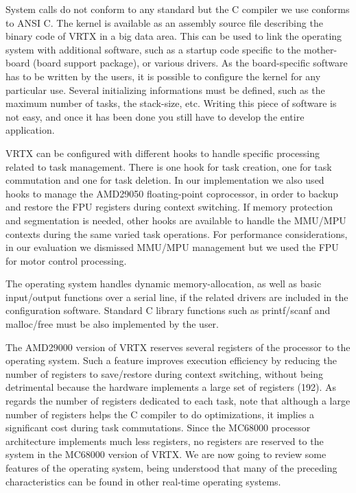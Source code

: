 \documentclass[10pt]{report}
\begin{document}
System calls do not conform to any standard but the C compiler we
use conforms to ANSI C. The kernel is available as an assembly
source file describing the binary code of VRTX in a big data area. 
This can be used to link the operating system with additional
software, such as a startup code specific to the mother-board 
(board support package), or various drivers. As the board-specific software
has to be written by the users, it is possible to configure the kernel
for any particular use. Several initializing informations must be
defined, such as the maximum number of tasks, the stack-size, etc. Writing
this piece of software is not easy, and once it has been done you still have to
develop the entire application.

VRTX can be configured with different hooks to handle specific
processing related to task management. There is one hook for
task creation, one for task commutation and one for task
deletion. In our implementation we also used hooks to manage the
AMD29050 floating-point coprocessor, in order to backup and
restore the FPU registers during context switching. If memory protection and segmentation 
is needed, other hooks are available to handle the MMU/MPU contexts during the same varied task
operations. For performance considerations, in our evaluation we dismissed MMU/MPU
management but we used the FPU for motor control processing.

The operating system handles dynamic memory-allocation, as well as basic
input/output functions over a serial line, if the related drivers are
included in the configuration software. Standard C library
functions such as printf/scanf and malloc/free must be also
implemented by the user.

The AMD29000 version of VRTX reserves several registers of the processor 
to the operating system. Such a feature improves execution efficiency by reducing the number of
registers to save/restore during context switching, without being detrimental because
the hardware implements a large set of registers (192). As regards
the number of registers dedicated to each task, note that
although a large number of registers helps the C compiler to do
optimizations, it implies a significant cost during task commutations. 
Since the MC68000 processor architecture implements much less registers, no registers are reserved 
to the system in the MC68000 version of VRTX. We are now going to review some
features of the operating system, being understood that many of
the preceding characteristics can be found in other real-time operating systems.
\end{document}
